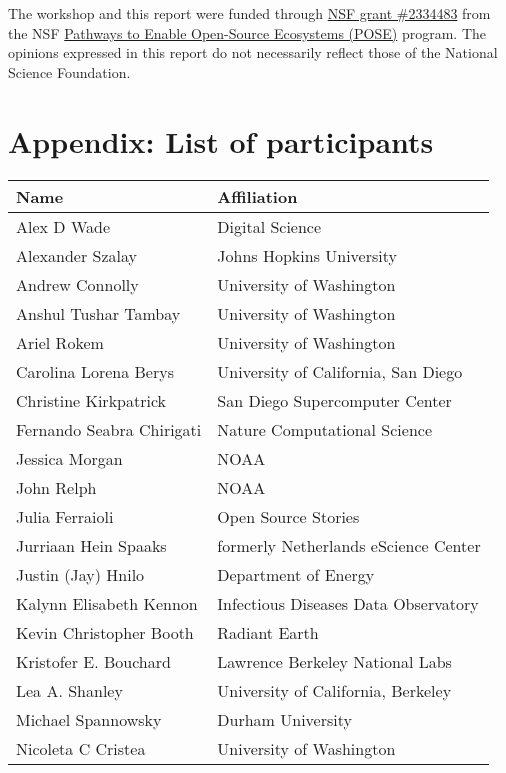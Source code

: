 \documentclass[
  number]{elsarticle}
\begin{document}
The workshop and this report were funded through
\href{https://www.nsf.gov/awardsearch/showAward?AWD_ID=2334483&HistoricalAwards=false}{NSF
grant \#2334483} from the NSF
\href{https://new.nsf.gov/funding/opportunities/pathways-enable-open-source-ecosystems-pose}{Pathways
to Enable Open-Source Ecosystems (POSE)} program. The opinions expressed
in this report do not necessarily reflect those of the National Science
Foundation.

\newpage

\section{Appendix: List of
participants}\label{appendix-list-of-participants}

\begin{longtable}[]{@{}ll@{}}
\toprule\noalign{}
Name & Affiliation \\
\midrule\noalign{}
\endhead
\bottomrule\noalign{}
\endlastfoot
Alex D Wade & Digital Science \\
Alexander Szalay & Johns Hopkins University \\
Andrew Connolly & University of Washington \\
Anshul Tushar Tambay & University of Washington \\
Ariel Rokem & University of Washington \\
Carolina Lorena Berys & University of California, San Diego \\
Christine Kirkpatrick & San Diego Supercomputer Center \\
Fernando Seabra Chirigati & Nature Computational Science \\
Jessica Morgan & NOAA \\
John Relph & NOAA \\
Julia Ferraioli & Open Source Stories \\
Jurriaan Hein Spaaks & formerly Netherlands eScience Center \\
Justin (Jay) Hnilo & Department of Energy \\
Kalynn Elisabeth Kennon & Infectious Diseases Data Observatory \\
Kevin Christopher Booth & Radiant Earth \\
Kristofer E. Bouchard & Lawrence Berkeley National Labs \\
Lea A. Shanley & University of California, Berkeley \\
Michael Spannowsky & Durham University \\
Nicoleta C Cristea & University of Washington \\

\end{longtable}
\end{document}
